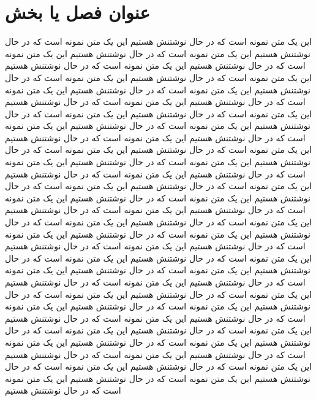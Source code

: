 \chapter{عنوان فصل یا بخش}
این یک متن نمونه است که در حال نوشتنش هستیم  این یک متن نمونه است که در حال نوشتنش هستیم این یک متن نمونه است که در حال نوشتنش هستیم این یک متن نمونه است که در حال نوشتنش هستیم این یک متن نمونه است که در حال نوشتنش هستیم این یک متن نمونه است که در حال نوشتنش هستیم این یک متن نمونه است که در حال نوشتنش هستیم
این یک متن نمونه است که در حال نوشتنش هستیم  این یک متن نمونه است که در حال نوشتنش هستیم این یک متن نمونه است که در حال نوشتنش هستیم این یک متن نمونه است که در حال نوشتنش هستیم این یک متن نمونه است که در حال نوشتنش هستیم این یک متن نمونه است که در حال نوشتنش هستیم این یک متن نمونه است که در حال نوشتنش هستیم
این یک متن نمونه است که در حال نوشتنش هستیم  این یک متن نمونه است که در حال نوشتنش هستیم این یک متن نمونه است که در حال نوشتنش هستیم این یک متن نمونه است که در حال نوشتنش هستیم این یک متن نمونه است که در حال نوشتنش هستیم این یک متن نمونه است که در حال نوشتنش هستیم این یک متن نمونه است که در حال نوشتنش هستیم
این یک متن نمونه است که در حال نوشتنش هستیم  این یک متن نمونه است که در حال نوشتنش هستیم این یک متن نمونه است که در حال نوشتنش هستیم این یک متن نمونه است که در حال نوشتنش هستیم این یک متن نمونه است که در حال نوشتنش هستیم این یک متن نمونه است که در حال نوشتنش هستیم این یک متن نمونه است که در حال نوشتنش هستیم
این یک متن نمونه است که در حال نوشتنش هستیم  این یک متن نمونه است که در حال نوشتنش هستیم این یک متن نمونه است که در حال نوشتنش هستیم این یک متن نمونه است که در حال نوشتنش هستیم این یک متن نمونه است که در حال نوشتنش هستیم این یک متن نمونه است که در حال نوشتنش هستیم این یک متن نمونه است که در حال نوشتنش هستیم
این یک متن نمونه است که در حال نوشتنش هستیم  این یک متن نمونه است که در حال نوشتنش هستیم این یک متن نمونه است که در حال نوشتنش هستیم این یک متن نمونه است که در حال نوشتنش هستیم این یک متن نمونه است که در حال نوشتنش هستیم این یک متن نمونه است که در حال نوشتنش هستیم این یک متن نمونه است که در حال نوشتنش هستیم
این یک متن نمونه است که در حال نوشتنش هستیم  این یک متن نمونه است که در حال نوشتنش هستیم این یک متن نمونه است که در حال نوشتنش هستیم این یک متن نمونه است که در حال نوشتنش هستیم این یک متن نمونه است که در حال نوشتنش هستیم این یک متن نمونه است که در حال نوشتنش هستیم این یک متن نمونه است که در حال نوشتنش هستیم

